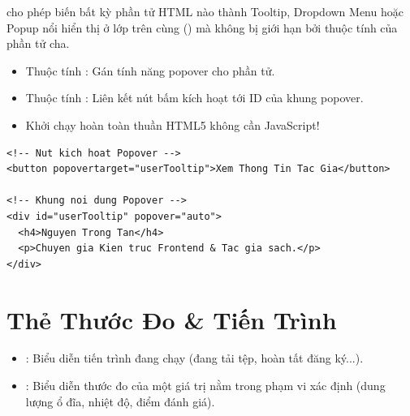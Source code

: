 \begin{conceptBox}
 cho phép biến bất kỳ phần tử HTML nào thành Tooltip, Dropdown Menu hoặc Popup nổi hiển thị ở lớp trên cùng () mà không bị giới hạn bởi thuộc tính  của phần tử cha.
\begin{itemize}[leftmargin=1.5em, itemsep=2pt, parsep=0pt]
    \item Thuộc tính : Gán tính năng popover cho phần tử.
    \item Thuộc tính : Liên kết nút bấm kích hoạt tới ID của khung popover.
    \item Khởi chạy hoàn toàn thuần HTML5 không cần JavaScript!
\end{itemize}
\end{conceptBox}

\begin{codeWindow}
\begin{lstlisting}[language=HTML5]
<!-- Nut kich hoat Popover -->
<button popovertarget="userTooltip">Xem Thong Tin Tac Gia</button>

<!-- Khung noi dung Popover -->
<div id="userTooltip" popover="auto">
  <h4>Nguyen Trong Tan</h4>
  <p>Chuyen gia Kien truc Frontend & Tac gia sach.</p>
</div>
\end{lstlisting}
\end{codeWindow}

\section{Thẻ Thước Đo  \& Tiến Trình }
\label{sec:meter_progress}

\begin{conceptBox}
\begin{itemize}[leftmargin=1.5em, itemsep=2pt, parsep=0pt]
    \item {}: Biểu diễn tiến trình đang chạy (đang tải tệp, hoàn tất đăng ký...).
    \item {}: Biểu diễn thước đo của một giá trị nằm trong phạm vi xác định (dung lượng ổ đĩa, nhiệt độ, điểm đánh giá).
\end{itemize}
\end{conceptBox}

